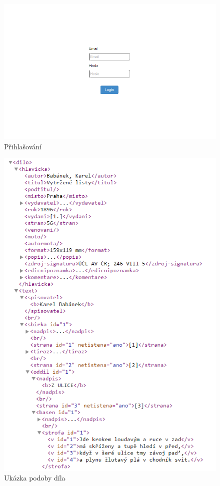 \documentclass[thesis=B,czech]{FITthesis}[2012/06/26]
\begin{document}
    \begin {figure}[H]\centering
        \includegraphics[width=\textwidth]{images/login}
        \caption {Přihlašování}
        \label {fig:login}
    \end{figure}

    \begin {figure}[H]\centering
        \includegraphics[width=\textwidth]{images/xml}
        \caption {Ukázka podoby díla}
        \label {fig:xml}
    \end{figure}   
\end{document}
